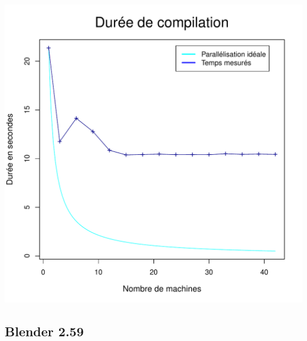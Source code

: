 \documentclass[a4paper, 11pt, titlepage]{article}
\begin{document}
\begin{center}
    \includegraphics[scale=0.55]{res/sujet_makefiles_blender_249_Makefile-recurse_nth8.pdf}
\end{center}


\subsection {Blender 2.59}
\end{document}
